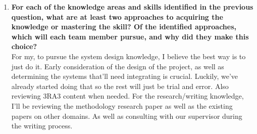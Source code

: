\begin{enumerate}
{  least one item for each team member.} \\
  I think the team needs to acquire system design knowledge. Although we've all had experience working adding/updating features of pre-existing projects, starting a completely new one and having to think of all the design requirements will be hard. Additionally, due to the research section, we'll also need to get research, and by expansion, writing knowledge.
  \item \textbf{For each of the knowledge areas and skills identified in the previous
  question, what are at least two approaches to acquiring the knowledge or
  mastering the skill?  Of the identified approaches, which will each team
  member pursue, and why did they make this choice?} \\
  For my, to pursue the system design knowledge, I believe the best way is to just do it. Early consideration of the design of the project, as well as determining the systems that'll need integrating is crucial. Luckily, we've already started doing that so the rest will just be trial and error. Also reviewing 3RA3 content when needed.
  For the research/writing knowledge, I'll be reviewing the methodology research paper as well as the existing papers on other domains. As well as consulting with our supervisor during the writing process.
\end{enumerate}

